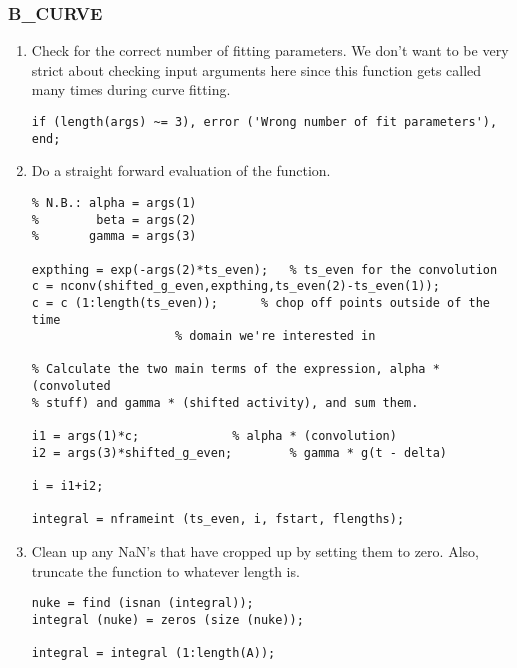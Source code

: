 \subsubsection{B\_CURVE}
\begin{enumerate}

\item Check for the correct number of fitting parameters.  We don't
want to be very strict about checking input arguments here since this
function gets called many times during curve fitting.
\begin{verbatim}
if (length(args) ~= 3), error ('Wrong number of fit parameters'), end;
\end{verbatim}

\item Do a straight forward evaluation of the function.  
\begin{verbatim}
% N.B.: alpha = args(1)
%        beta = args(2)
%       gamma = args(3)

expthing = exp(-args(2)*ts_even); 	% ts_even for the convolution
c = nconv(shifted_g_even,expthing,ts_even(2)-ts_even(1));
c = c (1:length(ts_even));		% chop off points outside of the time
					% domain we're interested in

% Calculate the two main terms of the expression, alpha * (convoluted
% stuff) and gamma * (shifted activity), and sum them.

i1 = args(1)*c;				% alpha * (convolution)
i2 = args(3)*shifted_g_even;		% gamma * g(t - delta)

i = i1+i2;

integral = nframeint (ts_even, i, fstart, flengths);
\end{verbatim}

\item Clean up any NaN's that have cropped up by setting them to zero.
Also, truncate the function to whatever length  is.
\begin{verbatim}
nuke = find (isnan (integral));
integral (nuke) = zeros (size (nuke));

integral = integral (1:length(A));
\end{verbatim}
\end{enumerate}





\newpage
